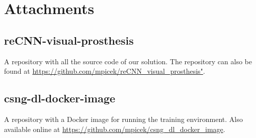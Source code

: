 \documentclass[12pt,a4paper]{report}
\let\openright=\clearpage
\begin{document}
\chapter{Attachments}

\section{reCNN-visual-prosthesis}\label{github_main}
A repository with all the source code of our solution. The repository can also be found at \url{https://github.com/mpicek/reCNN_visual_prosthesis"}.


\section{csng-dl-docker-image}\label{docker_image}
A repository with a Docker image for running the training environment. Also available online at \url{https://github.com/mpicek/csng_dl_docker_image}.



\openright
\end{document}
